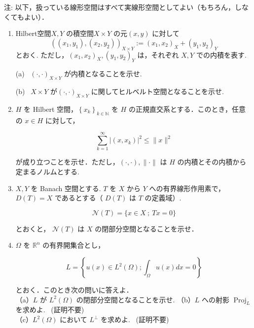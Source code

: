 \documentclass{jsarticle}
\begin{document}
注: 以下，扱っている線形空間はすべて実線形空間としてよい（もちろん，しなくてもよい）．

\begin{enumerate}
\item 
Hilbert空間$X, Y$ の積空間$X \times Y$ の元$(x, y)$ に対して
$$
\left(\left(x_{1}, y_{1}\right),\left(x_{2}, y_{2}\right)\right)_{X \times Y}:=\left(x_{1}, x_{2}\right)_{X}+\left(y_{1}, y_{2}\right)_{Y}
$$
とおく. ただし，$\left(x_{1}, x_{2}\right)_{X},\left(y_{1}, y_{2}\right)_{Y}$ は，それぞれ $X, Y$ での内積を表す.

(a) \ $(\cdot, \cdot)_{X \times Y}$ が内積となることを示せ.

(b) \ $X \times Y$ が$(\cdot, \cdot)_{X \times Y}$ に関してヒルベルト空間となることを示せ.

\vspace{13zw}

\item 
$H$ を Hilbert 空間，$\left\{x_{k}\right\}_{k \in \mathbb{N}}$ を $H$ の正規直交系とする．このとき，任意の $x \in H$ に対して，

$$
\sum_{k=1}^{\infty}\left|\left(x, x_{k}\right)\right|^{2} \leq\|x\|^{2}
$$

が成り立つことを示せ．ただし，$(\cdot, \cdot),\|\cdot\|$ は $H$ の内積とその内積から定まるノルムとする. 

\vspace{13zw}

\item
$X, Y$ を Banach 空間とする. $T$ を $X$ から $Y$ への有界線形作用素で，$D(T)=X$ であるとする（ $D(T)$ は $T$ の定義域）.

$$
\mathcal{N}(T)=\{x \in X \ ; \ T x=0\}
$$

とおくと， $\mathcal{N}(T)$ は $X$ の閉部分空間となることを示せ．


\newpage


\item
$\Omega$ を $\mathbb{R}^{n}$ の有界開集合とし，

$$
L=\left\{u(x) \in L^{2}(\Omega) ; \int_{\Omega} u(x) d x=0\right\}
$$

とおく．このとき次の問いに答えよ．\\
（a）$L$ が $L^{2}(\Omega)$ の閉部分空間となることを示せ. \hspace{8zw}
（b）$L$ への射影 $\operatorname{Proj}_{L}$ を求めよ. \ (証明不要) \\
（c）$L^{2}(\Omega)$ において $L^{\perp}$ を求めよ. \ (証明不要)


\end{enumerate}
\end{document}
